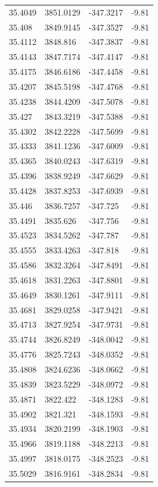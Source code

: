 \begin{table}[H]
\begin{tabular}{llll}
35.4049 & 3851.0129 & -347.3217 & -9.81 \\
35.408 & 3849.9145 & -347.3527 & -9.81 \\
35.4112 & 3848.816 & -347.3837 & -9.81 \\
35.4143 & 3847.7174 & -347.4147 & -9.81 \\
35.4175 & 3846.6186 & -347.4458 & -9.81 \\
35.4207 & 3845.5198 & -347.4768 & -9.81 \\
35.4238 & 3844.4209 & -347.5078 & -9.81 \\
35.427 & 3843.3219 & -347.5388 & -9.81 \\
35.4302 & 3842.2228 & -347.5699 & -9.81 \\
35.4333 & 3841.1236 & -347.6009 & -9.81 \\
35.4365 & 3840.0243 & -347.6319 & -9.81 \\
35.4396 & 3838.9249 & -347.6629 & -9.81 \\
35.4428 & 3837.8253 & -347.6939 & -9.81 \\
35.446 & 3836.7257 & -347.725 & -9.81 \\
35.4491 & 3835.626 & -347.756 & -9.81 \\
35.4523 & 3834.5262 & -347.787 & -9.81 \\
35.4555 & 3833.4263 & -347.818 & -9.81 \\
35.4586 & 3832.3264 & -347.8491 & -9.81 \\
35.4618 & 3831.2263 & -347.8801 & -9.81 \\
35.4649 & 3830.1261 & -347.9111 & -9.81 \\
35.4681 & 3829.0258 & -347.9421 & -9.81 \\
35.4713 & 3827.9254 & -347.9731 & -9.81 \\
35.4744 & 3826.8249 & -348.0042 & -9.81 \\
35.4776 & 3825.7243 & -348.0352 & -9.81 \\
35.4808 & 3824.6236 & -348.0662 & -9.81 \\
35.4839 & 3823.5229 & -348.0972 & -9.81 \\
35.4871 & 3822.422 & -348.1283 & -9.81 \\
35.4902 & 3821.321 & -348.1593 & -9.81 \\
35.4934 & 3820.2199 & -348.1903 & -9.81 \\
35.4966 & 3819.1188 & -348.2213 & -9.81 \\
35.4997 & 3818.0175 & -348.2523 & -9.81 \\
35.5029 & 3816.9161 & -348.2834 & -9.81 \\

\end{tabular}
\end{table}
